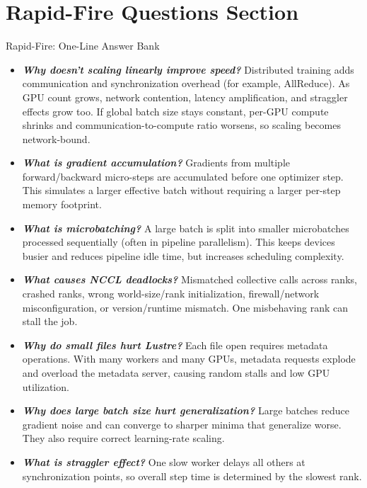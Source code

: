\documentclass[12pt]{article}
\let\origtextbf\textbf
\renewcommand{\textbf}[1]{\origtextbf{\textit{#1}}}
\begin{document}
\vspace{2cm}
\section{Rapid-Fire Questions Section}

\begin{bluebox}{Rapid-Fire: One-Line Answer Bank}
\begin{itemize}
\item \textbf{Why doesn't scaling linearly improve speed?} Distributed training adds communication and synchronization overhead (for example, AllReduce). As GPU count grows, network contention, latency amplification, and straggler effects grow too. If global batch size stays constant, per-GPU compute shrinks and communication-to-compute ratio worsens, so scaling becomes network-bound.

\item \textbf{What is gradient accumulation?} Gradients from multiple forward/backward micro-steps are accumulated before one optimizer step. This simulates a larger effective batch without requiring a larger per-step memory footprint.

\item \textbf{What is microbatching?} A large batch is split into smaller microbatches processed sequentially (often in pipeline parallelism). This keeps devices busier and reduces pipeline idle time, but increases scheduling complexity.

\item \textbf{What causes NCCL deadlocks?} Mismatched collective calls across ranks, crashed ranks, wrong world-size/rank initialization, firewall/network misconfiguration, or version/runtime mismatch. One misbehaving rank can stall the job.

\item \textbf{Why do small files hurt Lustre?} Each file open requires metadata operations. With many workers and many GPUs, metadata requests explode and overload the metadata server, causing random stalls and low GPU utilization.

\item \textbf{Why does large batch size hurt generalization?} Large batches reduce gradient noise and can converge to sharper minima that generalize worse. They also require correct learning-rate scaling.

\item \textbf{What is straggler effect?} One slow worker delays all others at synchronization points, so overall step time is determined by the slowest rank.


\end{itemize}
\end{bluebox}
\end{document}
